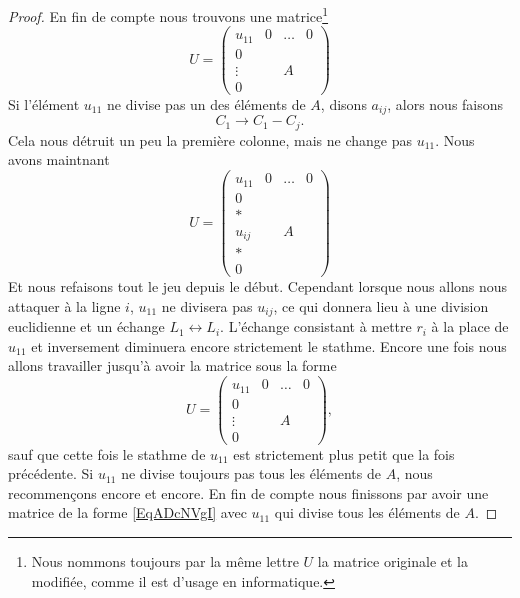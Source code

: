 \begin{proof}
    En fin de compte nous trouvons une matrice\footnote{Nous nommons toujours par la même lettre \( U\) la matrice originale et la modifiée, comme il est d'usage en informatique.}
    \begin{equation}
        U=\begin{pmatrix}
            u_{11}   &   0    &   \ldots    &   0    \\
             0   &       &       &       \\
             \vdots   &       &   A    &       \\
             0   &       &       &
         \end{pmatrix}
    \end{equation}
    Si l'élément \( u_{11}\) ne divise pas un des éléments de \( A\), disons \( a_{ij}\), alors nous faisons
    \begin{equation}
        C_1\to C_1-C_j.
    \end{equation}
    Cela nous détruit un peu la première colonne, mais ne change pas \( u_{11}\). Nous avons maintnant
    \begin{equation}
        U=\begin{pmatrix}
            u_{11}   &   0    &   \ldots    &   0    \\
             0   &       &       &       \\
             *   &       &       &       \\
             u_{ij}   &       &   A    &       \\
             *   &       &       &       \\
             0   &       &       &
         \end{pmatrix}
    \end{equation}
    Et nous refaisons tout le jeu depuis le début. Cependant lorsque nous allons nous attaquer à la ligne \( i\), \( u_{11}\) ne divisera pas \( u_{ij}\), ce qui donnera lieu à une division euclidienne et un échange \( L_1\leftrightarrow L_i\). L'échange consistant à mettre \( r_i\) à la place de \( u_{11}\) et inversement  diminuera encore strictement le stathme. Encore une fois nous allons travailler jusqu'à avoir la matrice sous la forme
    \begin{equation}    \label{EqADcNVgI}
        U=\begin{pmatrix}
            u_{11}   &   0    &   \ldots    &   0    \\
             0   &       &       &       \\
             \vdots   &       &   A    &       \\
             0   &       &       &
         \end{pmatrix},
    \end{equation}
    sauf que cette fois le stathme de \( u_{11}\) est strictement plus petit que la fois précédente. Si \( u_{11}\) ne divise toujours pas tous les éléments de \( A\), nous recommençons encore et encore. En fin de compte nous finissons par avoir une matrice de la forme \eqref{EqADcNVgI} avec \( u_{11}\) qui divise tous les éléments de \( A\).


\end{proof}
